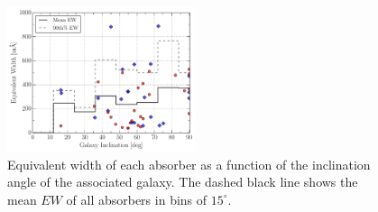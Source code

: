 \documentclass[iop]{emulateapj-rtx4}
\begin{document}


%


\begin{figure}[h!]
        \centering
        \includegraphics[width=0.49\textwidth]{W(fancy_inc)_mean_90_hist2.pdf}
        \caption{\small{Equivalent width of each absorber as a function of the inclination angle of the associated galaxy. The dashed black line shows the mean $EW$ of all absorbers in bins of $15^{\circ}$.}}
        \label{ew_vs_inclination}
        \vspace{2pt}
\end{figure}
\end{document}
